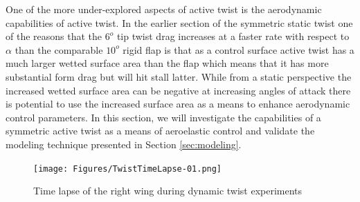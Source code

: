 \documentclass[11pt]{ucthesis}
\begin{document}
One of the more under-explored aspects of active twist is the aerodynamic capabilities of active twist. In the earlier section of the symmetric static twist one of the reasons that the $6^o$ tip twist drag increases at a faster rate with respect to $\alpha$ than the comparable $10^o$ rigid flap is that as a control surface active twist has a much larger wetted surface area than the flap which means that it has more substantial form drag but will hit stall latter. While from a static perspective the increased wetted surface area can be negative at increasing angles of attack there is potential to use the increased surface area as a means to enhance aerodynamic control parameters. In this section, we will investigate the capabilities of a symmetric active twist as a means of aeroelastic control and validate the modeling technique presented in Section \ref{sec:modeling}.

\begin{figure}[thpb]
\centering
\texttt{[image: Figures/TwistTimeLapse-01.png]}
\caption{Time lapse of the right wing during dynamic twist experiments}
\label{fig:timelapse}
\end{figure}
\end{document}
